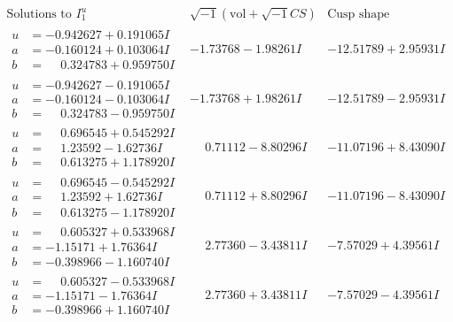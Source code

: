 \documentclass[1p]{elsarticle_modified}
\theoremstyle{definition}
\newcommand{\I}{\sqrt{-1}}
\begin{document}
$$\begin{array}{c|c|c}  
\text{Solutions to }I^u_{1}& \I (\text{vol} + \sqrt{-1}CS) & \text{Cusp shape}\\
 \hline 
\begin{aligned}
u &= -0.942627 + 0.191065 I \\
a &= -0.160124 + 0.103064 I \\
b &= \phantom{-}0.324783 + 0.959750 I\end{aligned}
 & -1.73768 - 1.98261 I & -12.51789 + 2.95931 I \\ \hline\begin{aligned}
u &= -0.942627 - 0.191065 I \\
a &= -0.160124 - 0.103064 I \\
b &= \phantom{-}0.324783 - 0.959750 I\end{aligned}
 & -1.73768 + 1.98261 I & -12.51789 - 2.95931 I \\ \hline\begin{aligned}
u &= \phantom{-}0.696545 + 0.545292 I \\
a &= \phantom{-}1.23592 - 1.62736 I \\
b &= \phantom{-}0.613275 + 1.178920 I\end{aligned}
 & \phantom{-}0.71112 - 8.80296 I & -11.07196 + 8.43090 I \\ \hline\begin{aligned}
u &= \phantom{-}0.696545 - 0.545292 I \\
a &= \phantom{-}1.23592 + 1.62736 I \\
b &= \phantom{-}0.613275 - 1.178920 I\end{aligned}
 & \phantom{-}0.71112 + 8.80296 I & -11.07196 - 8.43090 I \\ \hline\begin{aligned}
u &= \phantom{-}0.605327 + 0.533968 I \\
a &= -1.15171 + 1.76364 I \\
b &= -0.398966 - 1.160740 I\end{aligned}
 & \phantom{-}2.77360 - 3.43811 I & -7.57029 + 4.39561 I \\ \hline\begin{aligned}
u &= \phantom{-}0.605327 - 0.533968 I \\
a &= -1.15171 - 1.76364 I \\
b &= -0.398966 + 1.160740 I\end{aligned}
 & \phantom{-}2.77360 + 3.43811 I & -7.57029 - 4.39561 I \\ \hline\begin{aligned}

\end{aligned}
\end{array}$$
\end{document}
